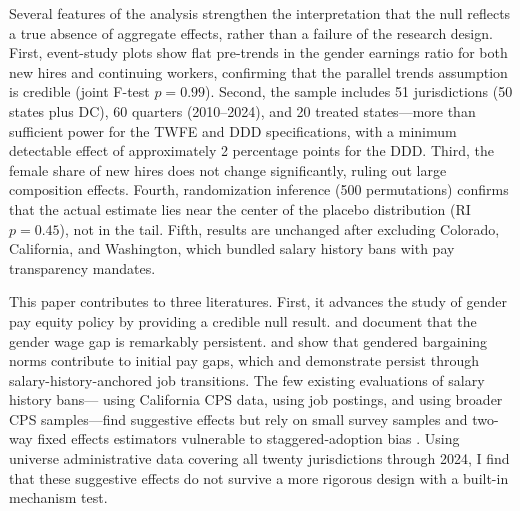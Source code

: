 \documentclass[12pt]{article}
\begin{document}
Several features of the analysis strengthen the interpretation that the null reflects a true absence of aggregate effects, rather than a failure of the research design. First, event-study plots show flat pre-trends in the gender earnings ratio for both new hires and continuing workers, confirming that the parallel trends assumption is credible (joint F-test $p = 0.99$). Second, the sample includes 51 jurisdictions (50 states plus DC), 60 quarters (2010--2024), and 20 treated states---more than sufficient power for the TWFE and DDD specifications, with a minimum detectable effect of approximately 2 percentage points for the DDD. Third, the female share of new hires does not change significantly, ruling out large composition effects. Fourth, randomization inference (500 permutations) confirms that the actual estimate lies near the center of the placebo distribution (RI $p = 0.45$), not in the tail. Fifth, results are unchanged after excluding Colorado, California, and Washington, which bundled salary history bans with pay transparency mandates.

This paper contributes to three literatures. First, it advances the study of gender pay equity policy by providing a credible null result. \citet{goldin2014grand} and \citet{blau2017gender} document that the gender wage gap is remarkably persistent. \citet{babcock2003women} and \citet{bowles2007social} show that gendered bargaining norms contribute to initial pay gaps, which \citet{barron2013relationship} and \citet{hall2018salary} demonstrate persist through salary-history-anchored job transitions. The few existing evaluations of salary history bans---\citet{hansen2020information} using California CPS data, \citet{bessen2020employer} using job postings, and \citet{sinha2023perpetuating} using broader CPS samples---find suggestive effects but rely on small survey samples and two-way fixed effects estimators vulnerable to staggered-adoption bias \citep{goodman2021difference, sun2021estimating}. Using universe administrative data covering all twenty jurisdictions through 2024, I find that these suggestive effects do not survive a more rigorous design with a built-in mechanism test.
\end{document}
